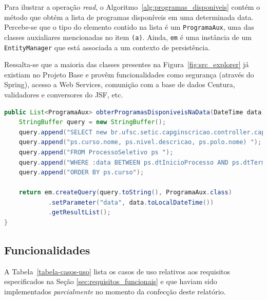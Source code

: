 \documentclass[
  10.5pt,				  %
	openright,			%
	twoside,			  %
  a5paper,
  chapter=TITLE,	%
	section=TITLE,	%
  hyphens,        %
	english,        %
	brazil          %
]{abntex2}
\begin{document}
Para ilustrar a operação \emph{read}, o Algoritmo~\ref{alg:programas_disponiveis} contém o método que obtém a lista de programas disponíveis em uma determinada data. Percebe-se que o tipo do elemento contido na lista é um \texttt{ProgramaAux}, uma das classes auxialiares mencionadas no item \texttt{(a)}. Ainda, \texttt{em} é uma instância de um \texttt{EntityManager} que está associada a um contexto de persistência.

Ressalta-se que a maioria das classes presentes na Figura~\ref{fig:src_explorer} já existiam no Projeto Base e provêm funcionalidades como segurança (através do Spring), acesso a Web Services, comunição com a base de dados Centura, validadores e conversores do JSF, etc.

\begin{landscape}
\begin{lstlisting}[language=java, caption={Obtenção da lista de programas disponíveis.}, label={alg:programas_disponiveis}]
public List<ProgramaAux> obterProgramasDisponiveisNaData(DateTime data) {
    StringBuffer query = new StringBuffer();
    query.append("SELECT new br.ufsc.setic.capginscricao.controller.capg.ProgramaAux(");
    query.append("ps.curso.nome, ps.nivel.descricao, ps.polo.nome) ");
    query.append("FROM ProcessoSeletivo ps ");
    query.append("WHERE :data BETWEEN ps.dtInicioProcesso AND ps.dtTerminoProcesso ");
    query.append("ORDER BY ps.curso");

    return em.createQuery(query.toString(), ProgramaAux.class)
            .setParameter("data", data.toLocalDateTime())
            .getResultList();
}
\end{lstlisting}
%
\end{landscape}



\subsection{Funcionalidades}\label{sec:funcionalidades}

A Tabela~\ref{tabela-casos-uso} lista os casos de uso relativos aos requisitos especificados na Seção \ref{sec:requisitos_funcionais} e que haviam sido implementados \emph{parcialmente} no momento da confecção deste relatório.
\end{document}
